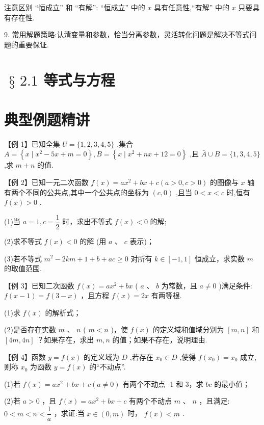 注意区别 “恒成立” 和 “有解”: “恒成立” 中的 $x$ 具有任意性,“有解” 中的 $x$ 只要具有存在性.

9. 常用解题策略:认清变量和参数，恰当分离参数，灵活转化问题是解决不等式问题的重要保证.

\section*{$\text{ § }{2.1}$ 等式与方程}

\section*{典型例题精讲}

【例 1】已知全集 $U = \{ 1,2,3,4,5\}$ ,集合 $A = \left\{  {x \mid  {x}^{2} - {5x} + m = 0}\right\}  ,B = \left\{  {x \mid  {x}^{2} + {nx} + {12} = 0}\right\}$ ,且 $\bar{A} \cup  B  = \{ 1,3,4,5\}$ ,求 $m + n$ 的值.

【例 2】已知一元二次函数 $f\left( x\right)  = a{x}^{2} + {bx} + c\left( {a > 0,c > 0}\right)$ 的图像与 $x$ 轴有两个不同的公共点,其中一个公共点的坐标为 $\left( {c,0}\right)$ ,且当 $0 < x < c$ 时,恒有 $f\left( x\right)  > 0$ .

(1)当 $a = 1,c = \dfrac{1}{2}$ 时，求出不等式 $f\left( x\right)  < 0$ 的解;

(2)求不等式 $f\left( x\right)  < 0$ 的解 (用 $a$ 、 $c$ 表示)；

(3)若不等式 ${m}^{2} - {2km} + 1 + b + {ac} \geq  0$ 对所有 $k \in  \left\lbrack  {-1,1}\right\rbrack$ 恒成立，求实数 $m$ 的取值范围.

【例 3】已知二次函数 $f\left( x\right)  = a{x}^{2} + {bx}$ ( $a$ 、 $b$ 为常数，且 $a \neq  0$ )满足条件: $f\left( {x - 1}\right)  = f\left( {3 - x}\right)$ ，且方程 $f\left( x\right)  = {2x}$ 有两等根.

(1)求 $f\left( x\right)$ 的解析式；

(2)是否存在实数 $m$ 、 $n$ ( $m < n$ )，使 $f\left( x\right)$ 的定义域和值域分别为 $\left\lbrack  {m,n}\right\rbrack$ 和 $\left\lbrack  {{4m},{4n}}\right\rbrack$ ？如果存在，求出 $m,n$ 的值；如果不存在，说明理由.

【例 4】函数 $y = f\left( x\right)$ 的定义域为 $D$ ,若存在 ${x}_{0} \in  D$ ,使得 $f\left( {x}_{0}\right)  = {x}_{0}$ 成立,则称 ${x}_{0}$ 为函数 $y = f\left( x\right)$ 的“不动点”.

(1)若 $f\left( x\right)  = a{x}^{2} + {bx} + c\left( {a \neq  0}\right)$ 有两个不动点 -1 和 3，求 ${bc}$ 的最小值；

(2)若 $a > 0$ ，且 $f\left( x\right)  = a{x}^{2} + {bx} + c$ 有两个不动点 $m$ 、 $n$ ，且满足: $0 < m < n < \dfrac{1}{a}$ ，求证:当 $x \in  \left( {0,m}\right)$ 时， $f\left( x\right)  < m$ .

